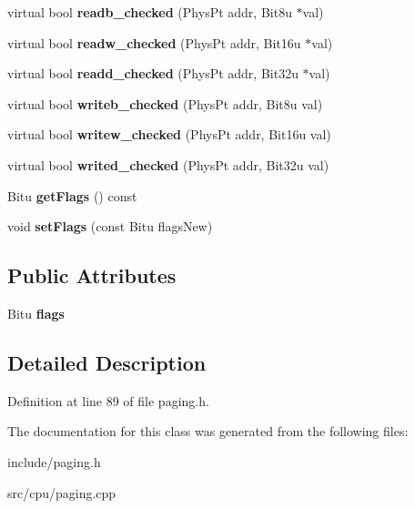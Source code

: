 \begin{DoxyCompactItemize}
\item 
\hypertarget{classPageHandler_ae3dcf8d33fef258d08637cb0baf51a3d}{virtual bool {\bfseries readb\-\_\-checked} (Phys\-Pt addr, Bit8u $\ast$val)}\label{classPageHandler_ae3dcf8d33fef258d08637cb0baf51a3d}

\item 
\hypertarget{classPageHandler_a69bd6b5dd4e6c86211129df23045711a}{virtual bool {\bfseries readw\-\_\-checked} (Phys\-Pt addr, Bit16u $\ast$val)}\label{classPageHandler_a69bd6b5dd4e6c86211129df23045711a}

\item 
\hypertarget{classPageHandler_a8f2c1c323c5159348031ae6d7ca11718}{virtual bool {\bfseries readd\-\_\-checked} (Phys\-Pt addr, Bit32u $\ast$val)}\label{classPageHandler_a8f2c1c323c5159348031ae6d7ca11718}

\item 
\hypertarget{classPageHandler_a82422408bbd70414178301a28288d83f}{virtual bool {\bfseries writeb\-\_\-checked} (Phys\-Pt addr, Bit8u val)}\label{classPageHandler_a82422408bbd70414178301a28288d83f}

\item 
\hypertarget{classPageHandler_a29ef48a06398c58d24085587ef4b53bf}{virtual bool {\bfseries writew\-\_\-checked} (Phys\-Pt addr, Bit16u val)}\label{classPageHandler_a29ef48a06398c58d24085587ef4b53bf}

\item 
\hypertarget{classPageHandler_a79466dd09c9c38475e180fb8e0f981f0}{virtual bool {\bfseries writed\-\_\-checked} (Phys\-Pt addr, Bit32u val)}\label{classPageHandler_a79466dd09c9c38475e180fb8e0f981f0}

\item 
\hypertarget{classPageHandler_a4ee12ff292c0c883d875ba67171f69b5}{Bitu {\bfseries get\-Flags} () const }\label{classPageHandler_a4ee12ff292c0c883d875ba67171f69b5}

\item 
\hypertarget{classPageHandler_a0280fa6d07a05a333ae3d58561389b9d}{void {\bfseries set\-Flags} (const Bitu flags\-New)}\label{classPageHandler_a0280fa6d07a05a333ae3d58561389b9d}

\end{DoxyCompactItemize}
\subsection*{Public Attributes}
\begin{DoxyCompactItemize}
\item 
\hypertarget{classPageHandler_afdba8b3717029016c4b530339a2440d3}{Bitu {\bfseries flags}}\label{classPageHandler_afdba8b3717029016c4b530339a2440d3}

\end{DoxyCompactItemize}


\subsection{Detailed Description}


Definition at line 89 of file paging.\-h.



The documentation for this class was generated from the following files\-:\begin{DoxyCompactItemize}
\item 
include/paging.\-h\item 
src/cpu/paging.\-cpp\end{DoxyCompactItemize}
